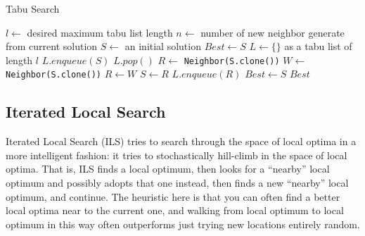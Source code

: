                     \begin{algorithm}[!htp]
                        \centering
                        \caption{Tabu Search}
                        \begin{algorithmic}[1]
                            \State $l \gets$ desired maximum tabu list length
                            \State $n \gets$ number of new neighbor generate from current solution
                            \State $S \gets$ an initial solution
                            \State $Best \gets S$
                            \State $L \gets \{\}$ as a tabu list of length $l$
                            \State $L.enqueue(S)$
                                    \State $L.pop()$
                                \EndWhile
                                \State $R \gets$ \texttt{Neighbor(S.clone())}
                                    \State $W \gets$ \texttt{Neighbor(S.clone())}
                                        \State $R \gets W$
                                    \EndIf
                                \EndFor
                                    \State $S \gets R$
                                    \State $L.enqueue(R)$
                                \EndIf
                                    \State $Best \gets S$
                                \EndIf
                            \EndWhile
                            \State \Return $Best$
                        \end{algorithmic}
                    \end{algorithm}

            \subsection{Iterated Local Search}
                    Iterated Local Search (ILS) tries to search through the space of local optima in a more intelligent fashion: it tries to stochastically hill-climb in the space of local optima. That is, ILS finds a local optimum, then looks for a ``nearby'' local optimum and possibly adopts that one instead, then finds a new ``nearby'' local optimum, and continue. The heuristic here is that you can often find a better local optima near to the current one, and walking from local optimum to local optimum in this way often outperforms just trying new locations entirely random.

